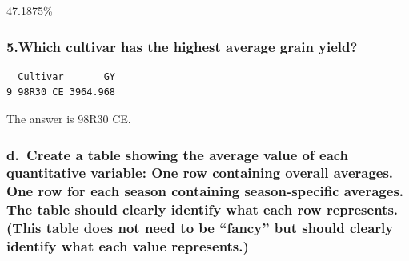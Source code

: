 \documentclass[
  letterpaper,
  DIV=11,
  numbers=noendperiod]{scrartcl}
\newenvironment{Shaded}{\begin{snugshade}}{\end{snugshade}}
\newcommand{\AttributeTok}[1]{\textcolor[rgb]{0.40,0.45,0.13}{#1}}
\newcommand{\CommentTok}[1]{\textcolor[rgb]{0.37,0.37,0.37}{#1}}
\newcommand{\FunctionTok}[1]{\textcolor[rgb]{0.28,0.35,0.67}{#1}}
\newcommand{\NormalTok}[1]{\textcolor[rgb]{0.00,0.23,0.31}{#1}}
\newcommand{\OtherTok}[1]{\textcolor[rgb]{0.00,0.23,0.31}{#1}}
\newcommand{\SpecialCharTok}[1]{\textcolor[rgb]{0.37,0.37,0.37}{#1}}
\begin{document}
47.1875\%

\subsubsection{5.Which cultivar has the highest average grain
yield?}\label{which-cultivar-has-the-highest-average-grain-yield}

\begin{Shaded}
\end{Shaded}

\begin{verbatim}
  Cultivar       GY
9 98R30 CE 3964.968
\end{verbatim}

The answer is 98R30 CE.

\subsubsection{d.~Create a table showing the average value of each
quantitative variable: One row containing overall averages. One row for
each season containing season-specific averages. The table should
clearly identify what each row represents. (This table does not need to
be ``fancy'' but should clearly identify what each value
represents.)}\label{d.-create-a-table-showing-the-average-value-of-each-quantitative-variable-one-row-containing-overall-averages.-one-row-for-each-season-containing-season-specific-averages.-the-table-should-clearly-identify-what-each-row-represents.-this-table-does-not-need-to-be-fancy-but-should-clearly-identify-what-each-value-represents.}
\end{document}
